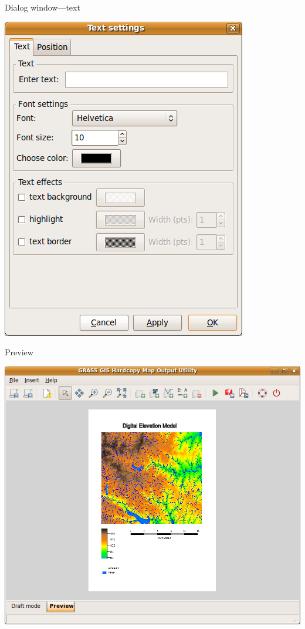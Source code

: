 \documentclass[xcolor=dvipsnames,beamer,compress]{beamer} %
\begin{document}
\begin{frame}{Dialog window---text}
\begin{center}
\includegraphics[height=0.8\textheight]{./screenshoty/text.png}
\end{center}
\end{frame}

\begin{frame}{Preview}
\begin{center}
\includegraphics[height=0.8\textheight]{./screenshoty/vysledek.png}
\end{center}
\end{frame}
\end{document}
